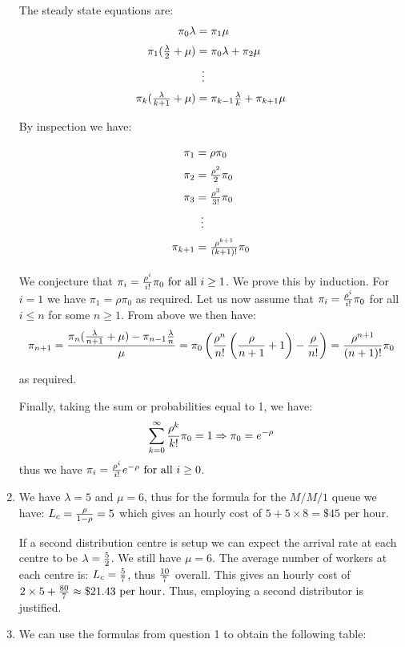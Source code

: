 \documentclass[12pt]{article}
\begin{document}
\begin{enumerate}
The steady state equations are:
$$\begin{array}{@{}r@{\;}c@{\;}l@{}}
\pi_0\lambda&=&\pi_1\mu\\[2mm]
\pi_1({\lambda\over2}+\mu)&=&\pi_0\lambda+\pi_2\mu\\[2mm]
&\vdots&\\[2mm]
\pi_{k}({\lambda\over k+1}+\mu)&=&\pi_{k-1}{\lambda\over k}+\pi_{k+1}\mu
\end{array}$$

By inspection we have:

$$\begin{array}{@{}r@{\;}c@{\;}l@{}}
\pi_1&=&\rho\pi_0\\[2mm]
\pi_2&=&{\rho^2\over 2}\pi_0\\[2mm]
\pi_3&=&{\rho^3\over 3!}\pi_0\\[2mm]
&\vdots&\\[2mm]
\pi_{k+1}&=&{\rho^{k+1}\over {(k+1)}!}\pi_0\\[2mm]
\end{array}$$

We conjecture that $\pi_i={\rho^i\over i!}\pi_0\text{ for all }i\geq1$. We prove this by induction. For $i=1$ we have $\pi_1=\rho\pi_0$ as required. Let us now assume that $\pi_i={\rho^i\over i!}\pi_0$ for all $i\leq n$ for some $n\geq 1$. From above we then have:
$$\pi_{n+1}={\pi_{n}({\lambda\over n+1}+\mu)-\pi_{n-1}{\lambda\over n}\over \mu}=\pi_0\left({\rho^n\over n!}\left({\rho\over n+1}+1\right)-{\rho\over n!}\right)={\rho^{n+1}\over (n+1)!}\pi_0$$

as required.

Finally, taking the sum or probabilities equal to 1, we have:
$$\sum_{k=0}^{\infty}{\rho^k\over k!}\pi_0=1\Rightarrow\pi_0=e^{-\rho}$$
thus we have $\pi_i={\rho^i\over i!}e^{-\rho}\text{ for all }i\geq0$.

\item We have $\lambda=5$ and $\mu=6$, thus for the formula for the $M/M/1$ queue we have:
$L_c={\rho\over1-\rho}=5$ which gives an hourly cost of $5+5\times8=\$45\text{ per hour}$.

If a second distribution centre is setup we can expect the arrival rate at each centre to be $\lambda={5\over 2}$. We still have $\mu=6$. The average number of workers at each centre is: $L_c={5\over7}$, thus ${10\over 7}$ overall. This gives an hourly cost of $2\times5+{80\over7}\approx\$21.43\text{ per hour}$. Thus, employing a second distributor is justified.


\item We can use the formulas from question 1 to obtain the following table:



\end{enumerate}
\end{document}

